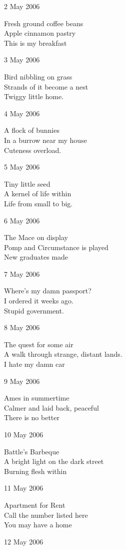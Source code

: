 \documentclass[12pt]{article}
\begin{document}
\newpage

2 May 2006

Fresh ground coffee beans \\
Apple cinnamon pastry \\
This is my breakfast

3 May 2006

Bird nibbling on grass \\
Strands of it become a nest \\
Twiggy little home.

4 May 2006

A flock of bunnies \\
In a burrow near my house \\
Cuteness overload.

5 May 2006

Tiny little seed \\
A kernel of life within \\
Life from small to big.

6 May 2006

The Mace on display \\
Pomp and Circumstance is played \\
New graduates made

7 May 2006

Where's my damn passport? \\
I ordered it weeks ago. \\
Stupid government.


\newpage


8 May 2006

The quest for some air \\
A walk through strange, distant lands. \\
I hate my damn car

9 May 2006

Ames in summertime \\
Calmer and laid back, peaceful \\
There is no better

10 May 2006

Battle's Barbeque \\
A bright light on the dark street \\
Burning flesh within

11 May 2006

Apartment for Rent \\
Call the number listed here \\
You may have a home

12 May 2006
\end{document}
